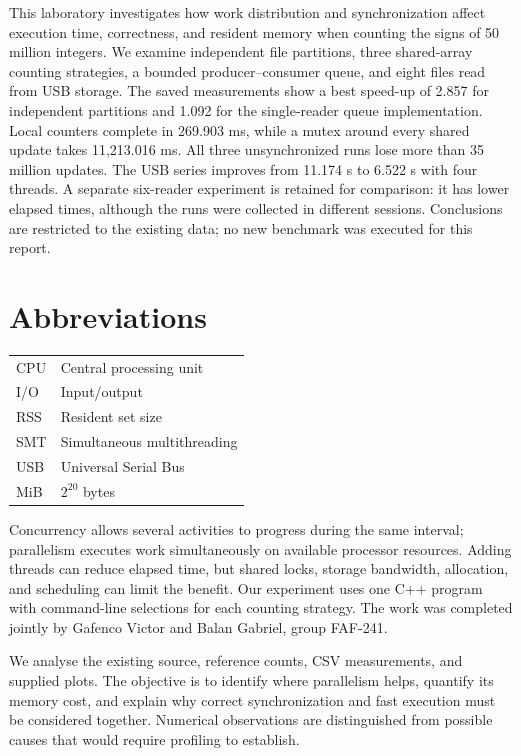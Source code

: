 \documentclass{../latex/utmreport}
\begin{document}
\makeutmreporttitlepage
\tableofcontents
\clearpage
\begin{utmabstract}[Abstract]
This laboratory investigates how work distribution and synchronization affect
execution time, correctness, and resident memory when counting the signs of
50 million integers. We examine independent file partitions, three shared-array
counting strategies, a bounded producer--consumer queue, and eight files read
from USB storage. The saved measurements show a best speed-up of 2.857 for
independent partitions and 1.092 for the single-reader queue implementation. Local counters
complete in 269.903 ms, while a mutex around every shared update takes
11,213.016 ms. All three unsynchronized runs lose more than 35 million updates.
The USB series improves from 11.174 s to 6.522 s with four threads.
A separate six-reader experiment is retained for comparison: it has lower
elapsed times, although the runs were collected in different sessions. Conclusions
are restricted to the existing data; no new benchmark was executed for this
report.
\end{utmabstract}

\chapter*{Abbreviations}
\noindent\begin{tabularx}{\textwidth}{lY}
CPU & Central processing unit \\
I/O & Input/output \\
RSS & Resident set size \\
SMT & Simultaneous multithreading \\
USB & Universal Serial Bus \\
MiB & $2^{20}$ bytes \\
\end{tabularx}

\utmintroduction
Concurrency allows several activities to progress during the same interval;
parallelism executes work simultaneously on available processor resources.
Adding threads can reduce elapsed time, but shared locks, storage bandwidth,
allocation, and scheduling can limit the benefit. Our experiment uses one
C++ program with command-line selections for each counting strategy. The
work was completed jointly by Gafenco Victor and Balan Gabriel, group FAF-241.

We analyse the existing source, reference counts, CSV measurements, and supplied
plots. The objective is to identify where parallelism helps, quantify its
memory cost, and explain why correct synchronization and fast execution must
be considered together. Numerical observations are distinguished from possible
causes that would require profiling to establish.
\end{document}
